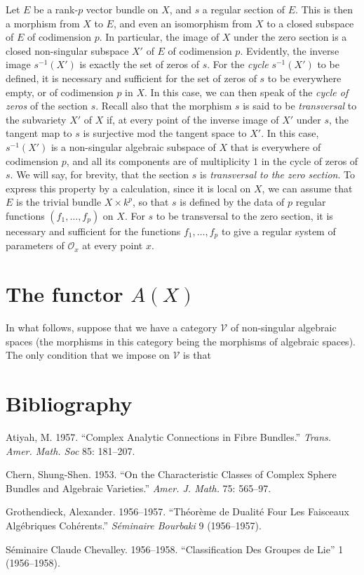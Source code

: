\documentclass{article}
\newcommand{\oldpage}[1]{\marginpar{\footnotesize$\Big\vert$ \textit{p.~#1}}}
\newenvironment{CSLReferences}[2]%
  {\section*{Bibliography}}%
  {\par}
\begin{document}
Let \(E\) be a rank-\(p\) vector bundle on \(X\), and \(s\) a regular section of \(E\).
This is then a morphism from \(X\) to \(E\), and even an isomorphism from \(X\) to a closed subspace of \(E\) of codimension \(p\).
In particular, the image of \(X\) under the zero section is a closed non-singular subspace \(X'\) of \(E\) of codimension \(p\).
Evidently, the inverse image \(s^{-1}(X')\) is exactly the set of zeros of \(s\).
For the \emph{cycle} \(s^{-1}(X')\) to be defined, it is necessary and sufficient for the set of zeros of \(s\) to be everywhere empty, or of codimension \(p\) in \(X\).
In this case, we can then speak of the \emph{cycle of zeros} of the section \(s\).
Recall also that the morphism \(s\) is said to be \emph{transversal} to the subvariety \(X'\) of \(X\) if, at every point of the inverse image of \(X'\) under \(s\), the tangent map to \(s\) is surjective mod the tangent space to \(X'\).
In this case, \(s^{-1}(X')\) is a non-singular algebraic subspace of \(X\) that is everywhere of codimension \(p\), and all its components are of multiplicity \(1\) in the cycle of zeros of \(s\).
We will say, for brevity, that the section \(s\) is \emph{transversal to the zero section}.
To express this property by a calculation, since it is local on \(X\), we can assume that \(E\) is the trivial bundle \(X\times k^p\), so that \(s\) is defined by the data of \(p\) regular functions \((f_1,\ldots,f_p)\) on \(X\).
For \(s\) to be transversal to the zero section, it is necessary and sufficient for the functions \(f_1,\ldots,f_p\) to give a regular system of parameters of \({\mathscr{O}}_x\) at every point \(x\).

\hypertarget{section-2}{%
\section{\texorpdfstring{The functor \(A(X)\)}{The functor A(X)}}\label{section-2}}

\oldpage{140}

In what follows, suppose that we have a category \({\mathcal{V}}\) of non-singular algebraic spaces (the morphisms in this category being the morphisms of algebraic spaces).
The only condition that we impose on \({\mathcal{V}}\) is that

\hypertarget{refs}{}
\begin{CSLReferences}{1}{0}
\leavevmode\hypertarget{ref-1}{}%
Atiyah, M. 1957. {``Complex Analytic Connections in Fibre Bundles.''} \emph{Trans. Amer. Math. Soc} 85: 181--207.

\leavevmode\hypertarget{ref-2}{}%
Chern, Shung-Shen. 1953. {``On the Characteristic Classes of Complex Sphere Bundles and Algebraic Varieties.''} \emph{Amer. J. Math.} 75: 565--97.

\leavevmode\hypertarget{ref-3}{}%
Grothendieck, Alexander. 1956--1957. {``Théorème de Dualité Four Les Faisceaux Algébriques Cohérents.''} \emph{Séminaire Bourbaki} 9 (1956--1957).

\leavevmode\hypertarget{ref-4}{}%
Séminaire Claude Chevalley. 1956--1958. {``Classification Des Groupes de {Lie}''} 1 (1956--1958).

\end{CSLReferences}
\end{document}
